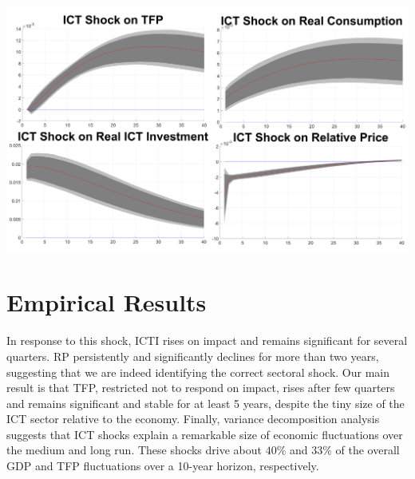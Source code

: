 \documentclass[a0,landscape]{a0poster}
\begin{document}
\begin{multicols}{4}

\begin{center}\vspace{1cm}
	\includegraphics[width=1\linewidth]{alltogether}
\end{center}\vspace{1cm}

\section*{Empirical Results}

In response to this shock, ICTI rises on impact and remains significant for several quarters. RP persistently and significantly declines for more than two years, suggesting that we are indeed identifying the correct sectoral shock. Our main result is that TFP, restricted not to respond on impact, rises after few quarters and remains significant and stable for at least 5 years, despite the tiny size of the ICT sector relative to the economy. Finally, variance decomposition analysis suggests that ICT shocks explain a remarkable size of economic fluctuations over the medium and long run. These shocks drive about $40$\% and $33$\% of the overall GDP and TFP fluctuations over a 10-year horizon, respectively.


\end{multicols}
\end{document}
